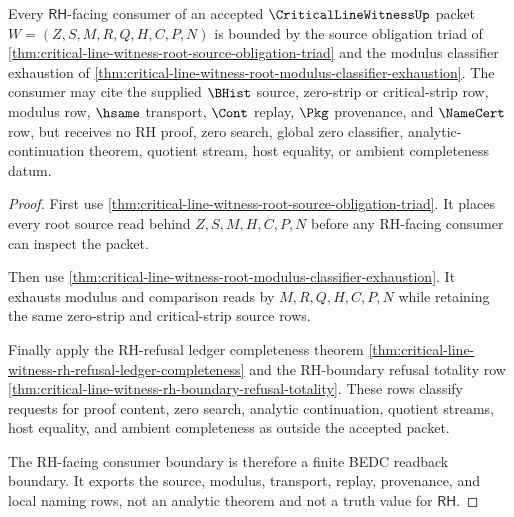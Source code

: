\begin{theorem}
\label{thm:critical-line-witness-root-rh-consumer-boundary}
Every $\mathsf{RH}$-facing consumer of an accepted $\CriticalLineWitnessUp$ packet $W=(Z,S,M,R,Q,H,C,P,N)$ is bounded by the source obligation triad of \autoref{thm:critical-line-witness-root-source-obligation-triad} and the modulus classifier exhaustion of \autoref{thm:critical-line-witness-root-modulus-classifier-exhaustion}. The consumer may cite the supplied $\BHist$ source, zero-strip or critical-strip row, modulus row, $\hsame$ transport, $\Cont$ replay, $\Pkg$ provenance, and $\NameCert$ row, but receives no RH proof, zero search, global zero classifier, analytic-continuation theorem, quotient stream, host equality, or ambient completeness datum.
\end{theorem}
\begin{proof}
First use \autoref{thm:critical-line-witness-root-source-obligation-triad}. It places every root source read behind $Z,S,M,H,C,P,N$ before any RH-facing consumer can inspect the packet.

Then use \autoref{thm:critical-line-witness-root-modulus-classifier-exhaustion}. It exhausts modulus and comparison reads by $M,R,Q,H,C,P,N$ while retaining the same zero-strip and critical-strip source rows.

Finally apply the RH-refusal ledger completeness theorem \autoref{thm:critical-line-witness-rh-refusal-ledger-completeness} and the RH-boundary refusal totality row \autoref{thm:critical-line-witness-rh-boundary-refusal-totality}. These rows classify requests for proof content, zero search, analytic continuation, quotient streams, host equality, and ambient completeness as outside the accepted packet.

The RH-facing consumer boundary is therefore a finite BEDC readback boundary. It exports the source, modulus, transport, replay, provenance, and local naming rows, not an analytic theorem and not a truth value for $\mathsf{RH}$.
\end{proof}
